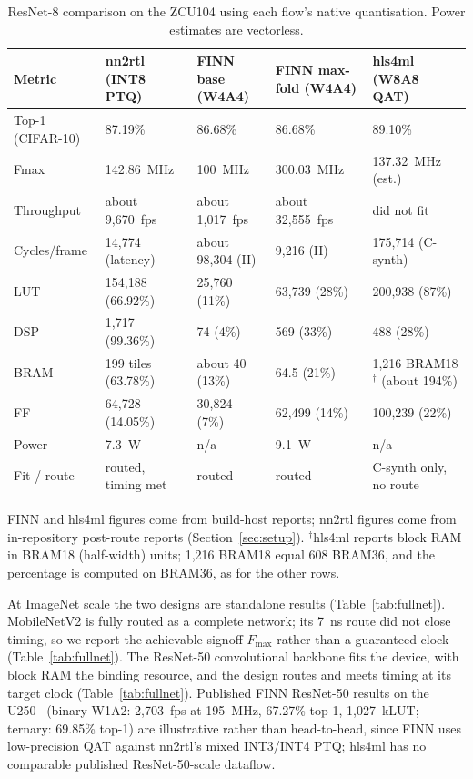\documentclass[acmtog,authorversion]{acmart}
\begin{document}
\begin{table}[t]
\centering
\caption{ResNet-8 comparison on the ZCU104 using each flow's native quantisation. Power estimates are vectorless.}
\label{tab:resnet8}
\begin{tabular}{@{}p{}p{}p{}p{}p{}@{}}
\toprule
Metric & nn2rtl (INT8 PTQ) & FINN base (W4A4) & FINN max-fold (W4A4) & hls4ml (W8A8 QAT) \\
\midrule
Top-1 (CIFAR-10) & 87.19\% & 86.68\% & 86.68\% & 89.10\% \\
Fmax & 142.86~MHz & 100~MHz & 300.03~MHz & 137.32~MHz (est.) \\
Throughput & about 9,670~fps & about 1,017~fps & about 32,555~fps & did not fit \\
Cycles/frame & 14,774 (latency) & about 98,304 (II) & 9,216 (II) & 175,714 (C-synth) \\
LUT & 154,188 (66.92\%) & 25,760 (11\%) & 63,739 (28\%) & 200,938 (87\%) \\
DSP & 1,717 (99.36\%) & 74 (4\%) & 569 (33\%) & 488 (28\%) \\
BRAM & 199 tiles (63.78\%) & about 40 (13\%) & 64.5 (21\%) & 1,216 BRAM18$^{\dagger}$ (about 194\%) \\
FF & 64,728 (14.05\%) & 30,824 (7\%) & 62,499 (14\%) & 100,239 (22\%) \\
Power & 7.3~W & n/a & 9.1~W & n/a \\
Fit / route & routed, timing met & routed & routed & C-synth only, no route \\
\bottomrule
\end{tabular}
\vspace{2pt}
\begin{minipage}{0.97\textwidth}
FINN and hls4ml figures come from build-host reports; nn2rtl figures come from in-repository post-route reports (Section~\ref{sec:setup}). $^{\dagger}$hls4ml reports block RAM in BRAM18 (half-width) units; 1,216 BRAM18 equal 608 BRAM36, and the percentage is computed on BRAM36, as for the other rows.
\end{minipage}
\end{table}

At ImageNet scale the two designs are standalone results (Table~\ref{tab:fullnet}). MobileNetV2 is fully routed as a complete network; its 7~ns route did not close timing, so we report the achievable signoff $F_{\max}$ rather than a guaranteed clock (Table~\ref{tab:fullnet}). The ResNet-50 convolutional backbone fits the device, with block RAM the binding resource, and the design routes and meets timing at its target clock (Table~\ref{tab:fullnet}). Published FINN ResNet-50 results on the U250~\cite{petrica2020} (binary W1A2: 2,703~fps at 195~MHz, 67.27\% top-1, 1,027~kLUT; ternary: 69.85\% top-1) are illustrative rather than head-to-head, since FINN uses low-precision QAT against nn2rtl's mixed INT3/INT4 PTQ; hls4ml has no comparable published ResNet-50-scale dataflow.
\end{document}
